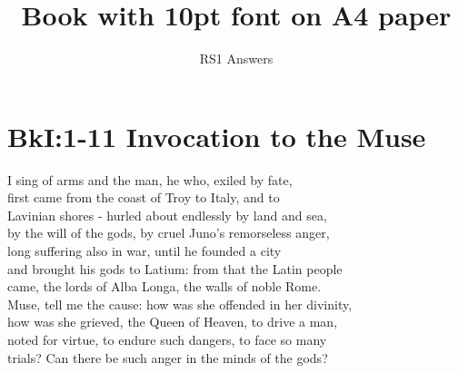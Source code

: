 \documentclass[10pt, a4paper, titlepage]{book}
\title{Book with 10pt font on A4 paper}
\author{RS1 Answers}
\date{}
\begin{document}
\maketitle

\section*{BkI:1-11 Invocation to the Muse}
I sing of arms and the man, he who, exiled by fate,\\
first came from the coast of Troy to Italy, and to\\
Lavinian shores - hurled about endlessly by land and sea,\\
by the will of the gods, by cruel Juno's remorseless anger,\\
long suffering also in war, until he founded a city\\
and brought his gods to Latium: from that the Latin people\\
came, the lords of Alba Longa, the walls of noble Rome.\\
Muse, tell me the cause: how was she offended in her divinity,\\
how was she grieved, the Queen of Heaven, to drive a man,\\
noted for virtue, to endure such dangers, to face so many\\
trials? Can there be such anger in the minds of the gods?

\end{document}
